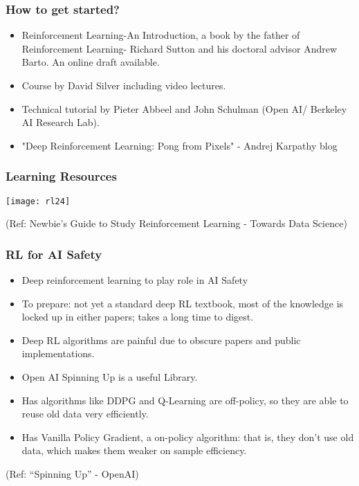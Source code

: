 \begin{frame}[fragile]\frametitle{How to get started?}

\begin{itemize}
\item Reinforcement Learning-An Introduction, a book by the father of Reinforcement Learning- Richard Sutton and his doctoral advisor Andrew Barto. An online draft available.
\item Course by David Silver including video lectures.
\item Technical tutorial by Pieter Abbeel and John Schulman (Open AI/ Berkeley AI Research Lab).
\item "Deep Reinforcement Learning: Pong from Pixels" - Andrej Karpathy blog
\end{itemize}

\end{frame}


\begin{frame}[fragile]\frametitle{Learning Resources}
\begin{center}
\texttt{[image: rl24]}
\end{center}
{\tiny (Ref: Newbie's Guide to Study Reinforcement Learning - Towards Data Science)}
\end{frame}

\begin{frame}\frametitle{RL for AI Safety}

\begin{itemize}
\item Deep reinforcement learning to play role in AI Safety
\item To prepare: not yet a standard deep RL textbook, most of the knowledge is locked up in either papers; takes a long time to digest.
\item Deep RL algorithms are painful due to obscure papers and public implementations.
\item Open AI Spinning Up is a useful Library.
\item Has algorithms like DDPG and Q-Learning are off-policy, so they are able to reuse old data very efficiently. 
\item Has Vanilla Policy Gradient, a on-policy algorithm: that is, they don't use old data, which makes them weaker on sample efficiency. 
\end{itemize}

{\tiny (Ref: ``Spinning Up'' - OpenAI)}

\end{frame}

